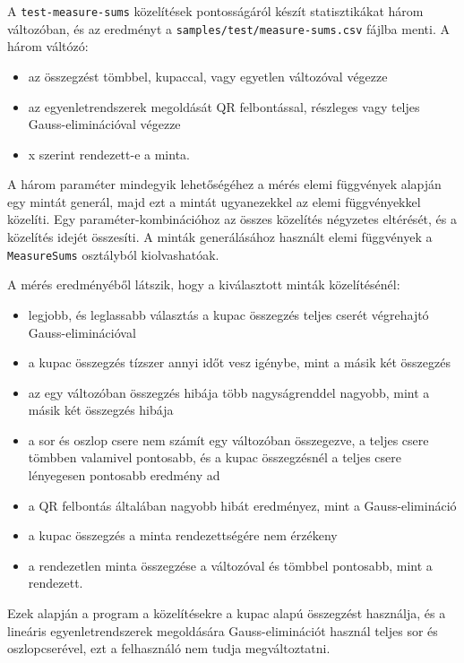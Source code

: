 A \texttt{test-measure-sums} közelítések pontosságáról készít statisztikákat három változóban, és az eredményt a \texttt{samples/test/measure-sums.csv} fájlba menti.
A három váltózó:
\begin{itemize}
\item az összegzést tömbbel, kupaccal, vagy egyetlen változóval végezze
\item az egyenletrendszerek megoldását QR felbontással, részleges vagy teljes Gauss-eliminációval végezze
\item x szerint rendezett-e a minta.
\end{itemize}
A három paraméter mindegyik lehetőségéhez a mérés elemi függvények alapján egy mintát generál, majd ezt a mintát ugyanezekkel az elemi függvényekkel közelíti.
Egy paraméter-kombinációhoz az összes közelítés négyzetes eltérését, és a közelítés idejét összesíti.
A minták generálásához használt elemi függvények a \texttt{MeasureSums} osztályból kiolvashatóak.

A mérés eredményéből látszik, hogy a kiválasztott minták közelítésénél:
\begin{itemize}
\item legjobb, és leglassabb választás a kupac összegzés teljes cserét végrehajtó Gauss-eliminációval
\item a kupac összegzés tízszer annyi időt vesz igénybe, mint a másik két összegzés
\item az egy változóban összegzés hibája több nagyságrenddel nagyobb, mint a másik két összegzés hibája
\item a sor és oszlop csere nem számít egy változóban összegezve, a teljes csere tömbben valamivel pontosabb, és a kupac összegzésnél a teljes csere lényegesen pontosabb eredmény ad
\item a QR felbontás általában nagyobb hibát eredményez, mint a Gauss-elimináció
\item a kupac összegzés a minta rendezettségére nem érzékeny
\item a rendezetlen minta összegzése a változóval és tömbbel pontosabb, mint a rendezett.
\end{itemize}
Ezek alapján a program a közelítésekre a kupac alapú összegzést használja, és a lineáris egyenletrendszerek megoldására Gauss-eliminációt használ teljes sor és oszlopcserével, ezt a felhasználó nem tudja megváltoztatni.

